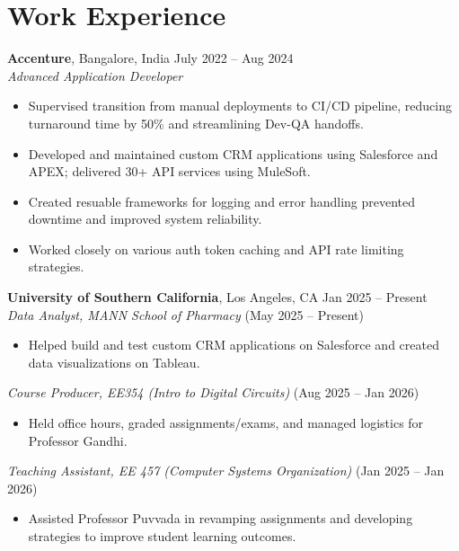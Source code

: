 \documentclass[letterpaper,10pt]{article}
\begin{document}
\section*{Work Experience}
    \textbf{Accenture}, Bangalore, India \hfill July 2022 -- Aug 2024 \\
    \textit{Advanced Application Developer}
    \begin{itemize}[leftmargin=*]
        \item Supervised transition from manual deployments to CI/CD pipeline, reducing turnaround time by 50\% and streamlining Dev-QA handoffs.
        \item Developed and maintained custom CRM applications using Salesforce and APEX; delivered 30+ API services using MuleSoft.
        \item Created resuable frameworks for logging and error handling prevented downtime and improved system reliability.
        \item Worked closely on various auth token caching and API rate limiting strategies.
    \end{itemize}

    \vspace{2pt}
    \textbf{University of Southern California}, Los Angeles, CA \hfill Jan 2025 -- Present \\
    \textit{Data Analyst, MANN School of Pharmacy} \hfill (May 2025 -- Present)
    \begin{itemize}[leftmargin=*]
        \item Helped build and test custom CRM applications on Salesforce and created data visualizations on Tableau.
    \end{itemize}
    
    \textit{Course Producer, EE354 (Intro to Digital Circuits)} \hfill (Aug 2025 -- Jan 2026)
    \begin{itemize}[leftmargin=*]
        \item Held office hours, graded assignments/exams, and managed logistics for Professor Gandhi.
    \end{itemize}
    
    \textit{Teaching Assistant, EE 457 (Computer Systems Organization)} \hfill (Jan 2025 -- Jan 2026)
    \begin{itemize}[leftmargin=*]
        \item Assisted Professor Puvvada in revamping assignments and developing strategies to improve student learning outcomes.
    \end{itemize}
\end{document}
